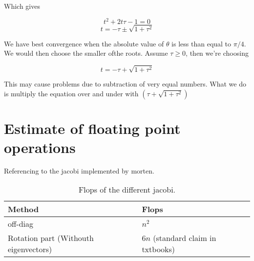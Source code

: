 \documentclass[a4paper,10pt,english]{article}
\numberwithin{figure}{section}
\numberwithin{table}{section}
\numberwithin{equation}{section}
\newcommand{\eqs}{\begin{equation}}
\newcommand{\eqf}{\end{equation}}
\begin{document}
Which gives 

\eqs t^2 + 2 t \tau - 1 = 0 \eqf
\eqs t = -\tau \pm \sqrt{1 + \tau^2} \eqf

We have best convergence when the absolute value of $\theta$ is less than equal to 
$\pi/4$. 
We would then choose the smaller ofthe roots. 
Assume $\tau \geq 0$, then we're choosing 

\eqs t = -\tau + \sqrt{1 + \tau^2} \eqf

This may cause problems due to subtraction of very equal numbers. 
What we do is multiply the equation over and under with $(\tau + \sqrt{1 + \tau^2})$ 


\section{Estimate of floating point operations}
Referencing to the jacobi implemented by morten. 

\begin{table}[h!]
        \centering 
        \begin{tabular}{ll}
                \toprule
                Method & Flops \\
                \midrule
                off-diag & $n^2$ \\
                Rotation part (Withouth eigenvectors) & $6n$ (standard claim in txtbooks) \\ 
                \bottomrule 
        \end{tabular}
        \caption{Flops of the different jacobi.}
\end{table}
\end{document}
